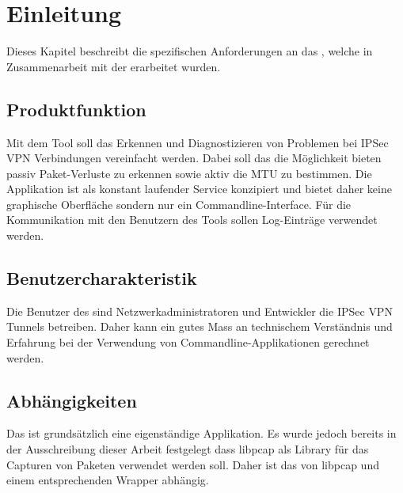 \section{Einleitung}
\label{sec:Einleitung}

Dieses Kapitel beschreibt die spezifischen Anforderungen an das \tool, welche in Zusammenarbeit mit der \osag erarbeitet wurden.

\subsection{Produktfunktion}
Mit dem Tool soll das Erkennen und Diagnostizieren von Problemen bei \acs{IPSec} \acs{VPN} Verbindungen vereinfacht werden. Dabei soll das \tool die Möglichkeit bieten passiv Paket-Verluste zu erkennen sowie aktiv die \acs{MTU} zu bestimmen. Die Applikation ist als konstant laufender Service konzipiert und bietet daher keine graphische Oberfläche sondern nur ein Commandline-Interface. Für die Kommunikation mit den Benutzern des Tools sollen Log-Einträge verwendet werden.

\subsection{Benutzercharakteristik}
Die Benutzer des \tool sind Netzwerkadministratoren und Entwickler die \acs{IPSec} \acs{VPN} Tunnels betreiben. Daher kann ein gutes Mass an technischem Verständnis und Erfahrung bei der Verwendung von Commandline-Applikationen gerechnet werden.

\subsection{Abhängigkeiten}
Das \tool ist grundsätzlich eine eigenständige Applikation. Es wurde jedoch bereits in der Ausschreibung dieser Arbeit festgelegt dass libpcap als Library für das Capturen von Paketen verwendet werden soll. Daher ist das \tool von libpcap und einem entsprechenden Wrapper abhängig.